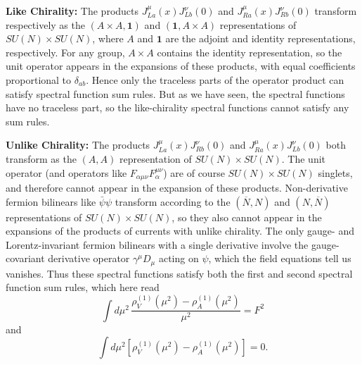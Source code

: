\noindent\textbf{Like Chirality:}\quad
The products $J_{La}^\mu(x)J_{Lb}^\nu(0)$ and $J_{Ra}^\mu(x)J_{Rb}^\nu(0)$ transform respectively as the $(A\times A,\mathbf{1})$ and $(\mathbf{1},A\times A)$ representations of $SU(N)\times SU(N)$, where $A$ and $\mathbf{1}$ are the adjoint and identity representations, respectively. For any group, $A\times A$ contains the identity representation, so the unit operator appears in the expansions of these products, with equal coefficients proportional to $\delta_{ab}$. Hence only the traceless parts of the operator product can satisfy spectral function sum rules. But as we have seen, the spectral functions have no traceless part, so the like-chirality spectral functions cannot satisfy any sum rules.

\noindent\textbf{Unlike Chirality:}\quad
The products $J_{La}^\mu(x)J_{Rb}^\nu(0)$ and $J_{Ra}^\mu(x)J_{Lb}^\nu(0)$ both transform as the $(A,A)$ representation of $SU(N)\times SU(N)$. The unit operator (and operators like $F_{\alpha\mu\nu}F_\alpha^{\mu\nu}$) are of course $SU(N)\times SU(N)$ singlets, and therefore cannot appear in the expansion of these products. Non-derivative fermion bilinears like $\bar\psi\psi$ transform according to the $(\overline N,N)$ and $(N,\overline N)$ representations of $SU(N)\times SU(N)$, so they also cannot appear in the expansions of the products of currents with unlike chirality. The only gauge- and Lorentz-invariant fermion bilinears with a single derivative involve the gauge-covariant derivative operator $\gamma^\mu D_\mu$ acting on $\psi$, which the field equations tell us vanishes. Thus these spectral functions satisfy both the first and second spectral function sum rules, which here read
\begin{equation}
\int d\mu^2\,
\frac{\rho_V^{(1)}(\mu^2)-\rho_A^{(1)}(\mu^2)}{\mu^2}
=F^2
\tag{20.5.18}\label{eq:20.5.18}
\end{equation}
and
\begin{equation}
\int d\mu^2
\left[
\rho_V^{(1)}(\mu^2)-\rho_A^{(1)}(\mu^2)
\right]=0.
\tag{20.5.19}\label{eq:20.5.19}
\end{equation}

